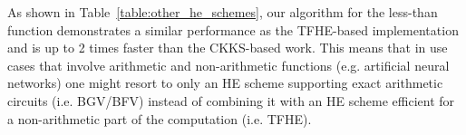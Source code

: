     As shown in Table~\ref{table:other_he_schemes}, our algorithm for the less-than function demonstrates a similar performance as the TFHE-based implementation and is up to 2 times faster than the CKKS-based work.
    This means that in use cases that involve arithmetic and non-arithmetic functions (e.g. artificial neural networks) one might resort to only an HE scheme supporting exact arithmetic circuits (i.e. BGV/BFV) instead of combining it with an HE scheme efficient for a non-arithmetic part of the computation (i.e. TFHE).
    
